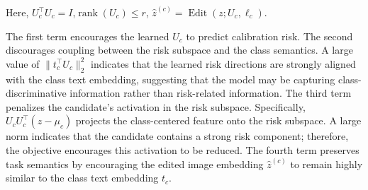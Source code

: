 Here, \(U_c^{\top}U_c=I\),\(\operatorname{rank}(U_c)\le r\), \(\hat z^{(c)}=\operatorname{Edit}(z;U_c,\ell_c)\).


The first term encourages the learned \(U_c\) to predict calibration risk. The second discourages coupling between the risk subspace and the class semantics. A large value of \(\|t_c^{\top}U_c\|_2^2\) indicates that the learned risk directions are strongly aligned with the class text embedding, suggesting that the model may be capturing class-discriminative information rather than risk-related information. The third term penalizes the candidate's activation in the risk subspace. Specifically, \(U_cU_c^{\top}(z-\mu_c)\) projects the class-centered feature onto the risk subspace. A large norm indicates that the candidate contains a strong risk component; therefore, the objective encourages this activation to be reduced. The fourth term preserves task semantics by encouraging the edited image embedding \(\hat z^{(c)}\) to remain highly similar to the class text embedding \(t_c\).

